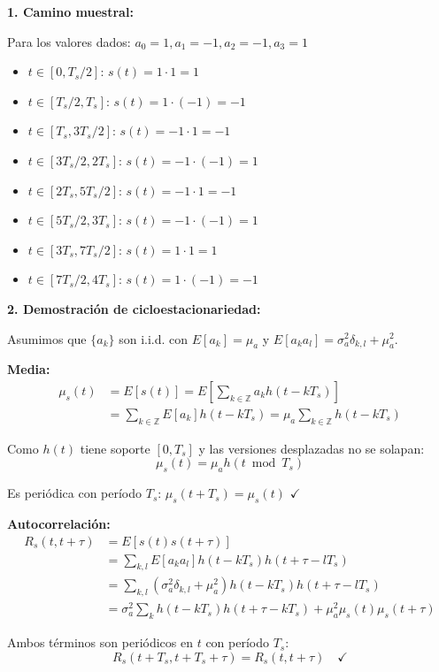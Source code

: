 \documentclass[10pt,a4paper]{article}
\begin{document}
\begin{solucion}
\textbf{1. Camino muestral:}

Para los valores dados: $a_0 = 1, a_1 = -1, a_2 = -1, a_3 = 1$

\begin{itemize}
\item $t \in [0, T_s/2]$: $s(t) = 1 \cdot 1 = 1$
\item $t \in [T_s/2, T_s]$: $s(t) = 1 \cdot (-1) = -1$
\item $t \in [T_s, 3T_s/2]$: $s(t) = -1 \cdot 1 = -1$
\item $t \in [3T_s/2, 2T_s]$: $s(t) = -1 \cdot (-1) = 1$
\item $t \in [2T_s, 5T_s/2]$: $s(t) = -1 \cdot 1 = -1$
\item $t \in [5T_s/2, 3T_s]$: $s(t) = -1 \cdot (-1) = 1$
\item $t \in [3T_s, 7T_s/2]$: $s(t) = 1 \cdot 1 = 1$
\item $t \in [7T_s/2, 4T_s]$: $s(t) = 1 \cdot (-1) = -1$
\end{itemize}

\textbf{2. Demostración de cicloestacionariedad:}

Asumimos que $\{a_k\}$ son i.i.d. con $E[a_k] = \mu_a$ y $E[a_k a_l] = \sigma_a^2 \delta_{k,l} + \mu_a^2$.

\textbf{Media:}
\begin{align*}
\mu_s(t) &= E[s(t)] = E\left[\sum_{k \in \mathbb{Z}} a_k h(t - kT_s)\right]\\
&= \sum_{k \in \mathbb{Z}} E[a_k] h(t - kT_s) = \mu_a \sum_{k \in \mathbb{Z}} h(t - kT_s)
\end{align*}

Como $h(t)$ tiene soporte $[0, T_s]$ y las versiones desplazadas no se solapan:
\[
\mu_s(t) = \mu_a h(t \bmod T_s)
\]

Es periódica con período $T_s$: $\mu_s(t + T_s) = \mu_s(t)$ $\checkmark$

\textbf{Autocorrelación:}
\begin{align*}
R_s(t, t+\tau) &= E[s(t)s(t+\tau)]\\
&= \sum_{k,l} E[a_k a_l] h(t - kT_s) h(t + \tau - lT_s)\\
&= \sum_{k,l} (\sigma_a^2 \delta_{k,l} + \mu_a^2) h(t - kT_s) h(t + \tau - lT_s)\\
&= \sigma_a^2 \sum_k h(t - kT_s) h(t + \tau - kT_s) + \mu_a^2 \mu_s(t)\mu_s(t+\tau)
\end{align*}

Ambos términos son periódicos en $t$ con período $T_s$:
\[
R_s(t + T_s, t + T_s + \tau) = R_s(t, t+\tau) \quad \checkmark
\]


\end{solucion}
\end{document}
